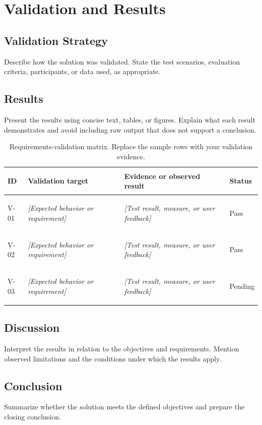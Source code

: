 \chapter{Validation and Results}
\label{chap:validation}

\section{Validation Strategy}
Describe how the solution was validated. State the test scenarios, evaluation criteria, participants, or data used, as appropriate.

\section{Results}
Present the results using concise text, tables, or figures. Explain what each result demonstrates and avoid including raw output that does not support a conclusion.

\begin{table}[H]
\centering
\small
\setlength{\tabcolsep}{5pt}
\renewcommand{\arraystretch}{1.25}
\begin{tabularx}{\textwidth}{@{}>{\bfseries\raggedright\arraybackslash}p{1.5cm}>{\raggedright\arraybackslash}p{3.8cm}X>{\centering\arraybackslash}p{1.8cm}@{}}
\toprule
\rowcolor{lightblue}
\textbf{ID} & \textbf{Validation target} & \textbf{Evidence or observed result} & \textbf{Status} \\
\midrule
V-01 & \textit{[Expected behavior or requirement]} & \textit{[Test result, measure, or user feedback]} & Pass \\
V-02 & \textit{[Expected behavior or requirement]} & \textit{[Test result, measure, or user feedback]} & Pass \\
V-03 & \textit{[Expected behavior or requirement]} & \textit{[Test result, measure, or user feedback]} & Pending \\
\bottomrule
\end{tabularx}
\caption{Requirements-validation matrix. Replace the sample rows with your validation evidence.}
\label{tab:validation-results}
\end{table}

\section{Discussion}
Interpret the results in relation to the objectives and requirements. Mention observed limitations and the conditions under which the results apply.

\section*{Conclusion}
Summarize whether the solution meets the defined objectives and prepare the closing conclusion.
